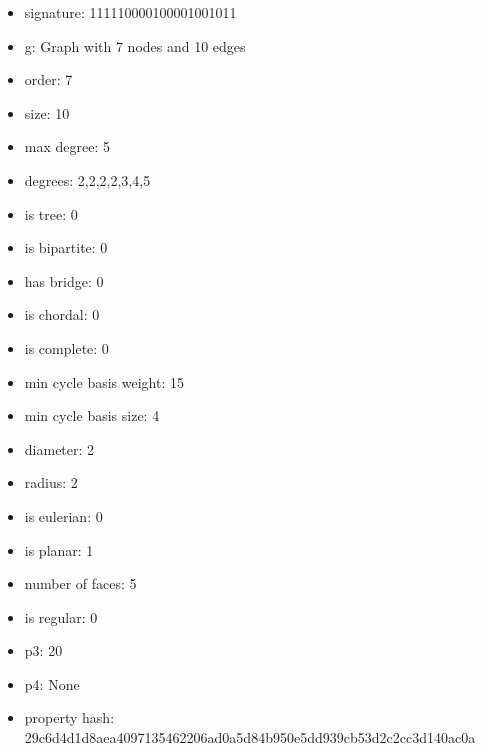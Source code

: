 \begin{itemize}
\item signature: 111110000100001001011
\item g: Graph with 7 nodes and 10 edges
\item order: 7
\item size: 10
\item max degree: 5
\item degrees: 2,2,2,2,3,4,5
\item is tree: 0
\item is bipartite: 0
\item has bridge: 0
\item is chordal: 0
\item is complete: 0
\item min cycle basis weight: 15
\item min cycle basis size: 4
\item diameter: 2
\item radius: 2
\item is eulerian: 0
\item is planar: 1
\item number of faces: 5
\item is regular: 0
\item p3: 20
\item p4: None
\item property hash: 29c6d4d1d8aea4097135462206ad0a5d84b950e5dd939cb53d2c2cc3d140ac0a
\end{itemize}
\newpage
\begin{figure}
\end{figure}

